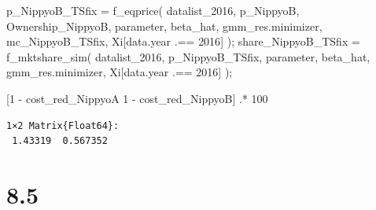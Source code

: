 \documentclass[
  letterpaper,
  DIV=11,
  numbers=noendperiod]{scrreprt}
\newenvironment{Shaded}{\begin{snugshade}}{\end{snugshade}}
\newcommand{\FloatTok}[1]{\textcolor[rgb]{0.68,0.00,0.00}{#1}}
\newcommand{\FunctionTok}[1]{\textcolor[rgb]{0.28,0.35,0.67}{#1}}
\newcommand{\NormalTok}[1]{\textcolor[rgb]{0.00,0.23,0.31}{#1}}
\newcommand{\OperatorTok}[1]{\textcolor[rgb]{0.37,0.37,0.37}{#1}}
\begin{document}
\begin{Shaded}
\begin{Highlighting}[]
\NormalTok{p\_NippyoB\_TSfix }\OperatorTok{=} \FunctionTok{f\_eqprice}\NormalTok{(}
\NormalTok{    datalist\_2016, }
\NormalTok{    p\_NippyoB, }
\NormalTok{    Ownership\_NippyoB,}
\NormalTok{    parameter, }
\NormalTok{    beta\_hat, }
\NormalTok{    gmm\_res.minimizer, }
\NormalTok{    mc\_NippyoB\_TSfix, }
\NormalTok{    Xi[data.year }\OperatorTok{.==} \FloatTok{2016}\NormalTok{]}
\NormalTok{    );}
\NormalTok{share\_NippyoB\_TSfix }\OperatorTok{=} \FunctionTok{f\_mktshare\_sim}\NormalTok{(}
\NormalTok{    datalist\_2016, }
\NormalTok{    p\_NippyoB\_TSfix, }
\NormalTok{    parameter, }
\NormalTok{    beta\_hat, }
\NormalTok{    gmm\_res.minimizer, }
\NormalTok{    Xi[data.year }\OperatorTok{.==} \FloatTok{2016}\NormalTok{]}
\NormalTok{    );}
\end{Highlighting}
\end{Shaded}

\begin{Shaded}
\begin{Highlighting}[]
\NormalTok{[}\FloatTok{1} \OperatorTok{{-}}\NormalTok{ cost\_red\_NippyoA }\FloatTok{1} \OperatorTok{{-}}\NormalTok{ cost\_red\_NippyoB] }\OperatorTok{.*} \FloatTok{100}
\end{Highlighting}
\end{Shaded}

\begin{verbatim}
1×2 Matrix{Float64}:
 1.43319  0.567352
\end{verbatim}

\hypertarget{section-20}{%
\section{8.5}\label{section-20}}
\end{document}
